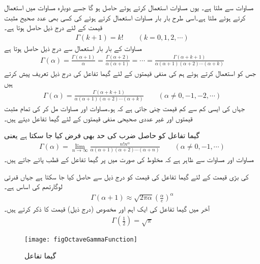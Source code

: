 مساوات  سے  ملتا ہے۔ یوں مساوات  استعمال کرتے ہوئے  حاصل ہو گا جسے دوبارہ مساوات  میں استعمال کرتے ہوئے  ملتا ہے۔اسی طرح بار بار مساوات  استعمال کرتے ہوئے  کی کسی بھی عدد صحیح مثبت قیمت  کے لئے درج ذیل حاصل ہوتا ہے۔
\begin{align}\label{مساوات_ضمیمہ_گیما_تکمل_پ}
\Gamma(k+1)=k!\quad \quad (k=0,1,2,\cdots)
\end{align} 
مساوات  کے بار بار استعمال سے  درج ذیل حاصل ہوتا ہے
\begin{align*}
\Gamma(\alpha)=\frac{\Gamma(\alpha+1)}{\alpha}=\frac{\Gamma(\alpha+2)}{\alpha(\alpha+1)}=\cdots=\frac{\Gamma(\alpha+k+1)}{\alpha(\alpha+1)(\alpha+2)\cdots(\alpha+k)}
\end{align*}
جس کو استعمال کرتے ہوئے ہم  کی منفی قیمتوں کے لئے گیما تفاعل کی درج ذیل تعریف پیش کرتے ہیں
\begin{align}\label{مساوات_ضمیمہ_گیما_تکمل_ت}
\Gamma(\alpha)=\frac{\Gamma(\alpha+k+1)}{\alpha(\alpha+1)(\alpha+2)\cdots(\alpha+k)}\quad \quad (\alpha\ne 0, -1,-2,\cdots)
\end{align}
جہاں  کی ایسی کم سے کم قیمت چنی جاتی ہے کہ  ہو۔مساوات  اور مساوات  مل کر  کی تمام مثبت قیمتوں اور غیر عددی صحیحی منفی قیمتوں کے لئے گیما تفاعل دیتے ہیں۔

گیما تفاعل کو حاصل ضرب کی حد بھی فرض کیا جا سکتا ہے یعنی
\begin{align}\label{مساوات_ضمیمہ_گیما_تکمل_ٹ}
\Gamma(\alpha)=\lim_{n\to \infty} \frac{n! n^{\alpha}}{\alpha(\alpha+1)(\alpha+2)\cdots(\alpha+n)} \quad \quad (\alpha \ne 0, -1,\cdots)
\end{align}  
مساوات  اور مساوات  سے ظاہر ہے کہ مخلوط  کی صورت میں  پر گیما تفاعل کے قطب پائے جاتے ہیں۔

 کی بڑی قیمت کے لئے گیما تفاعل کی قیمت کو درج ذیل سے حاصل کیا جا سکتا ہے جہاں  قدرتی لوگارتھم کی اساس ہے۔
\begin{align}
\Gamma(\alpha+1)\approx \sqrt{2\pi \alpha}\left(\frac{\alpha}{e}\right)^\alpha
\end{align}
آخر میں گیما تفاعل کی ایک اہم اور مخصوص (درج ذیل) قیمت کا ذکر کرتے ہیں۔
\begin{align}
\Gamma\left(\frac{1}{2}\right)=\sqrt{\pi}
\end{align}
%
\begin{figure}
\centering
\texttt{[image: figOctaveGammaFunction]}
\caption{گیما تفاعل}
\label{شکل_ضمیمہ_مفید_گیما_تفاعل}
\end{figure}
%

